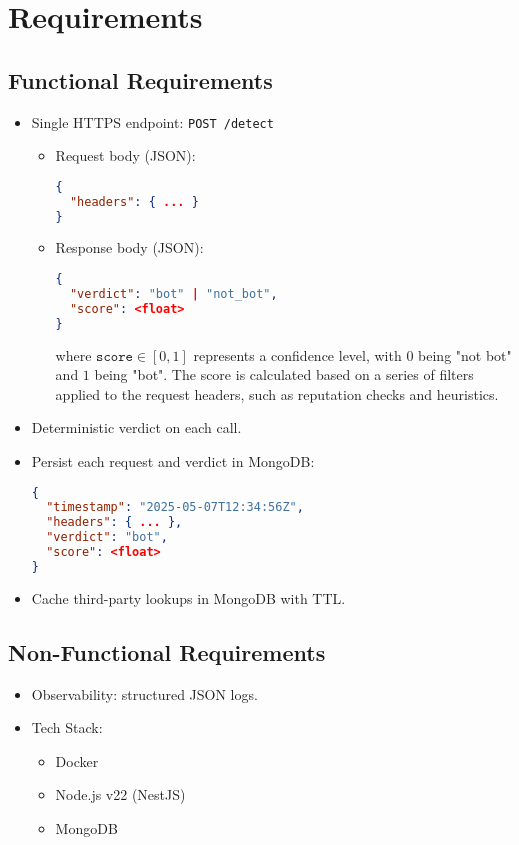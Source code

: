 \documentclass[12pt,a4paper]{article}
\begin{document}
\newpage 
\section{Requirements}

\subsection{Functional Requirements}
\begin{itemize}
  \item Single HTTPS endpoint: \lstinline|POST /detect|  
    \begin{itemize}
      \item Request body (JSON):
        \begin{lstlisting}[language=json,frame=none]
{
  "headers": { ... }
}
        \end{lstlisting}
      \item Response body (JSON):
        \begin{lstlisting}[language=json,frame=none]
{
  "verdict": "bot" | "not_bot",
  "score": <float>
}
        \end{lstlisting}
         where \(\texttt{score} \in [0,1]\) represents a confidence level, with \(0\) being "not bot" and \(1\) being "bot". The score is calculated based on a series of filters applied to the request headers, such as reputation checks and heuristics.
    \end{itemize}
  \item Deterministic verdict on each call.
  \item Persist each request and verdict in MongoDB:
    \begin{lstlisting}[language=json,frame=none]
{
  "timestamp": "2025-05-07T12:34:56Z",
  "headers": { ... },
  "verdict": "bot",
  "score": <float>
}
    \end{lstlisting}
  \item Cache third-party lookups in MongoDB with TTL.
\end{itemize}

\subsection{Non-Functional Requirements}
\begin{itemize}
  \item Observability: structured JSON logs.
  \item Tech Stack:
    \begin{itemize}
      \item Docker
      \item Node.js v22 (NestJS)
      \item MongoDB
    \end{itemize}
\end{itemize}
\end{document}
